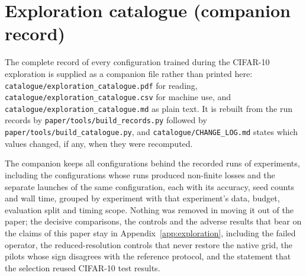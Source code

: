 \FloatBarrier
\section{Exploration catalogue (companion record)}
\label{app:catalogue}
The complete record of every configuration trained during the CIFAR-10 exploration is
supplied as a companion file rather than printed here: \texttt{catalogue/exploration\_catalogue.pdf}
for reading, \texttt{catalogue/exploration\_catalogue.csv} for machine use, and
\texttt{catalogue/exploration\_catalogue.md} as plain text. It is rebuilt from the run
records by \texttt{paper/tools/build\_records.py} followed by
\texttt{paper/tools/build\_catalogue.py}, and \texttt{catalogue/CHANGE\_LOG.md} states
which values changed, if any, when they were recomputed.

The companion keeps all \idxConfigurations{} configurations behind the
\idxRuns{} recorded runs of \idxExperiments{} experiments, including the configurations
whose runs produced non-finite losses and the separate launches of the same
configuration, each with its accuracy, seed counts and wall time, grouped by experiment
with that experiment's data, budget, evaluation split and timing scope. Nothing was
removed in moving it out of the paper; the decisive comparisons, the controls and the
adverse results that bear on the claims of this paper stay in
Appendix~\ref{app:exploration}, including the failed operator, the reduced-resolution
controls that never restore the native grid, the pilots whose sign disagrees with the
reference protocol, and the statement that the selection reused CIFAR-10 test results.
